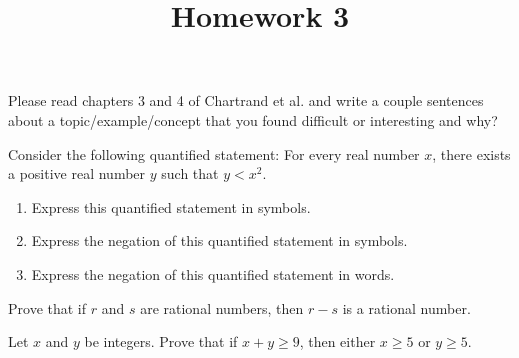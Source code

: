 \documentclass{homework}
\title{Homework 3}
\begin{document}
 \maketitle

\question Please read chapters 3 and 4 of Chartrand et al. and write a couple sentences about a topic/example/concept that you found difficult or interesting and why?

\question Consider the following quantified statement: For every real number $x$, there exists a positive real number $y$ such that $y < x^2$.

\begin{enumerate}[label=(\alph*)]
	\item Express this quantified statement in symbols.
	\item Express the negation of this quantified statement in symbols.
	\item Express the negation of this quantified statement in words.
\end{enumerate}

\question Prove that if $r$ and $s$ are rational numbers, then $r - s$ is a rational number.


\question Let $x$ and $y$ be integers. Prove that if $x + y \geq 9$, then either $x \geq 5$ or $y \geq 5$.

\end{document}
